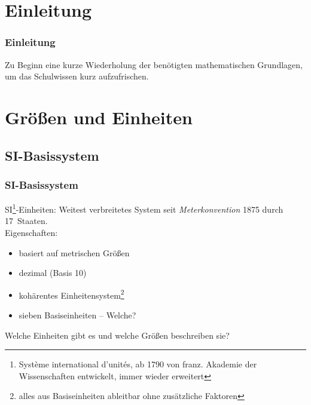 

\subtitle{Technik Klasse E 01: \\
  Mathematische Grundlagen und Einheiten \\[2em]}
\date{Stand 10.10.2016}


\section{Einleitung}

\begin{frame}
  \frametitle{Einleitung}

  Zu Beginn eine kurze Wiederholung der benötigten mathematischen Grundlagen,
  um das Schulwissen kurz aufzufrischen.

\end{frame}

\section{Größen und Einheiten}

\subsection{SI-Basissystem}

\begin{frame}
  \frametitle{SI-Basissystem}

  SI\footnote{Système international d’unités, ab 1790 von franz. Akademie der
  Wissenschaften entwickelt, immer wieder erweitert}-Einheiten: Weitest
  verbreitetes System seit \emph{Meterkonvention} 1875 durch 17~Staaten.
  \\[1em]

  Eigenschaften:

  \begin{itemize}
    \item basiert auf metrischen Größen
    \item dezimal (Basis 10)
    \item kohärentes Einheitensystem\footnote{alles aus Basiseinheiten
      ableitbar ohne zusätzliche Faktoren}
    \item sieben Basiseinheiten -- Welche?
  \end{itemize}

  \bigskip \pause
  Welche Einheiten gibt es und welche Größen beschreiben sie?

\end{frame}

